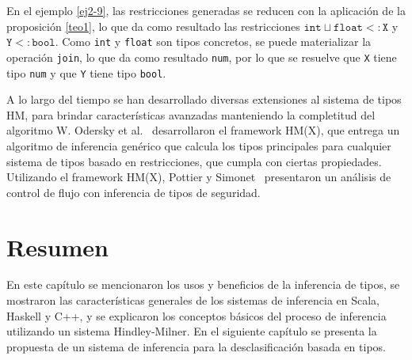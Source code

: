 En el ejemplo \ref{ej2-9}, las restricciones generadas se reducen con la aplicación de la proposición \ref{teo1}, lo que da como resultado las restricciones $\mathtt{int\sqcup float <: X}$ y $\mathtt{Y <: bool}$. Como \texttt{int} y \texttt{float} son tipos concretos, se puede materializar la operación \texttt{join}, lo que da como resultado \texttt{num}, por lo que se resuelve que \texttt{X} tiene tipo \texttt{num} y que \texttt{Y} tiene tipo \texttt{bool}.

A lo largo del tiempo se han desarrollado diversas extensiones al sistema de tipos HM, para brindar características avanzadas manteniendo la completitud del algoritmo W. Odersky et al.~\cite{odersky} desarrollaron el framework HM(X), que entrega un algoritmo de inferencia genérico que calcula los tipos principales para cualquier sistema de tipos basado en restricciones, que cumpla con ciertas propiedades. Utilizando el framework HM(X), Pottier y Simonet~\cite{Pottier} presentaron un análisis de control de flujo con inferencia de tipos de seguridad.
\clearpage
\section*{Resumen}

En este capítulo se mencionaron los usos y beneficios de la inferencia de tipos, se mostraron las características generales de los sistemas de inferencia en Scala, Haskell y C++, y se explicaron los conceptos básicos del proceso de inferencia utilizando un sistema Hindley-Milner. En el siguiente capítulo se presenta la propuesta de un sistema de inferencia para la desclasificación basada en tipos.

